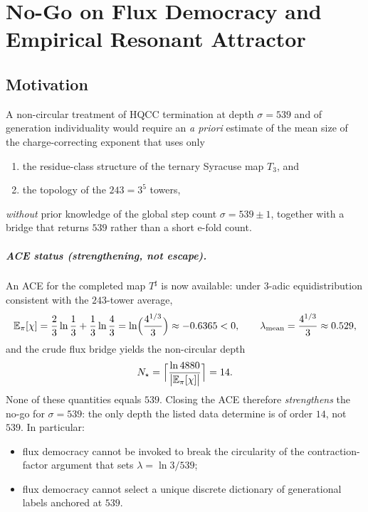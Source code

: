 
\chapter{No-Go on Flux Democracy and Empirical Resonant Attractor}
\label{ch:nogo-attractor}

\section{Motivation}

A non-circular treatment of HQCC termination at depth \(\sigma=539\) and of
generation individuality would require an \emph{a priori} estimate of the mean
size of the charge-correcting exponent that uses only
\begin{enumerate}[label=(\roman*)]
  \item the residue-class structure of the ternary Syracuse map \(T_3\), and
  \item the topology of the \(243=3^5\) towers,
\end{enumerate}
\emph{without} prior knowledge of the global step count \(\sigma=539\pm 1\),
together with a bridge that returns \(539\) rather than a short e-fold count.

\paragraph{ACE status (strengthening, not escape).}
An ACE for the completed map \(T^\sharp\) is now available: under \(3\)-adic
equidistribution consistent with the \(243\)-tower average,
\[
\mathbb{E}_\pi[\chi]
=\frac23\ln\frac13+\frac13\ln\frac43
=\ln\Bigl(\frac{4^{1/3}}{3}\Bigr)
\approx -0.6365
<0,
\qquad
\lambda_{\mathrm{mean}}=\frac{4^{1/3}}{3}\approx 0.529,
\]
and the crude flux bridge yields the non-circular depth
\[
N_\star
=\Bigl\lceil\frac{\ln 4880}{\bigl|\mathbb{E}_\pi[\chi]\bigr|}\Bigr\rceil
=14.
\]
None of these quantities equals \(539\). Closing the ACE therefore
\emph{strengthens} the no-go for \(\sigma=539\): the only depth the listed data
determine is of order \(14\), not \(539\). In particular:
\begin{itemize}
  \item flux democracy cannot be invoked to break the circularity of the
        contraction-factor argument that sets \(\lambda=\ln 3/539\);
  \item flux democracy cannot select a unique discrete dictionary of
        generational labels anchored at \(539\).
\end{itemize}

